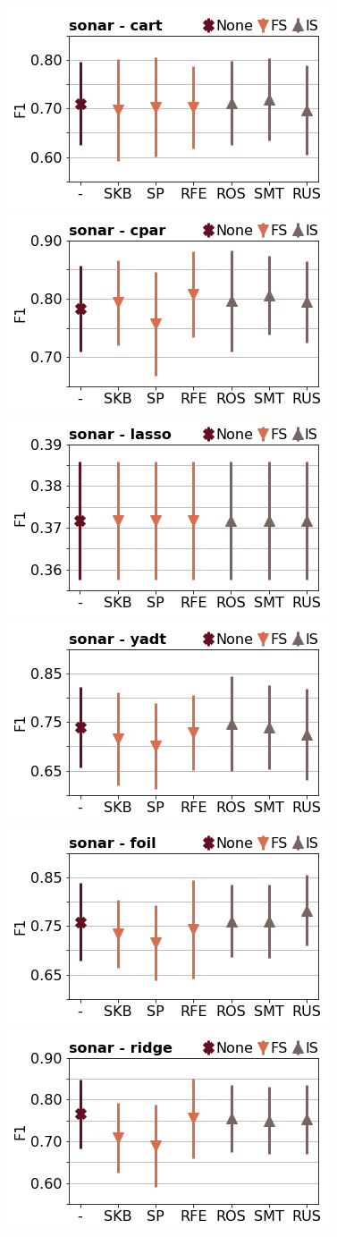 \documentclass[runningheads,a4paper]{llncs}
\begin{document}
\begin{figure}[!h]
\includegraphics[width=0.32\linewidth]{fig/preps_sonar_DT_sklearn_f1score.png}
\includegraphics[width=0.32\linewidth]{fig/preps_sonar_RB_cpar_f1score.png}
\includegraphics[width=0.32\linewidth]{fig/preps_sonar_LM_lasso_f1score.png}
\includegraphics[width=0.32\linewidth]{fig/preps_sonar_DT_yadt_f1score.png}
\includegraphics[width=0.32\linewidth]{fig/preps_sonar_RB_foil_f1score.png}
\includegraphics[width=0.32\linewidth]{fig/preps_sonar_LM_ridge_f1score.png}
\end{figure}
\end{document}
